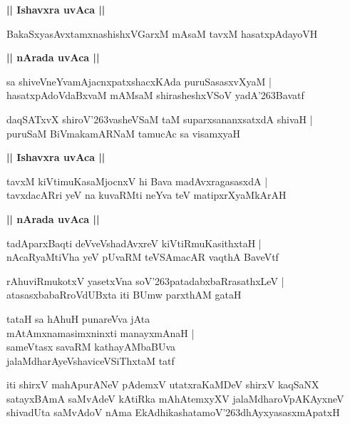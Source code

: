 \documentclass[twoside,12pt,openright]{book}
\def\S{\char'263}
\newcounter{shloka}[chapter]
\def\uvaca#1{\centerline{{\large\textbf{#1}}}}
\begin{document}
\uvaca{|| Ishavxra uvAca ||}

\begin{shloka}%
BakaSxyasAvxtamxnashishxVGarxM mAsaM tavxM hasatxpAdayoVH 
\end{shloka}

\uvaca{|| nArada uvAca ||}

\begin{shloka}%
sa shiveVneYvamAjacnxpatxshacxKAda puruSasasxvXyaM |\\
hasatxpAdoVdaBxvaM mAMsaM shirasheshxVSoV yadA\S Bavatf 
\end{shloka}

\begin{shloka}%
daqSATxvX shiroV\S vasheVSaM taM suparxsananxsatxdA shivaH |\\
puruSaM BiVmakamARNaM tamucAc sa visamxyaH 
\end{shloka}

\uvaca{|| Ishavxra uvAca ||}

\begin{shloka}%
tavxM kiVtimuKasaMjocnxV hi Bava madAvxragasasxdA |\\
tavxdacARri yeV na kuvaRMti neYva teV matipxrXyaMkArAH 
\end{shloka}

\uvaca{|| nArada uvAca ||}

\begin{shloka}%
tadAparxBaqti deVveVshadAvxreV kiVtiRmuKasithxtaH |\\
nAcaRyaMtiVha yeV pUvaRM teVSAmacAR vaqthA BaveVtf 
\end{shloka}

\begin{shloka}%
rAhuviRmukotxV yasetxVna soV\S patadabxbaRrasathxLeV |\\
atasasxbabaRroVdUBxta iti BUmw parxthAM gataH 
\end{shloka}

\begin{shloka}%
tataH sa hAhuH punareVva jAta \\
mAtAmxnamasimxninxti manayxmAnaH |\\
sameVtasx savaRM kathayAMbaBUva \\
jalaMdharAyeVshaviceVSiThxtaM tatf
\end{shloka}

\begin{center}
iti shirxV mahApurANeV pAdemxV utatxraKaMDeV shirxV kaqSaNX satayxBAmA saMvAdeV kAtiRka 
mAhAtemxyXV jalaMdharoVpAKAyxneV shivadUta saMvAdoV nAma EkAdhikashatamoV\S dhAyxyasasxmApatxH
\end{center}
\end{document}

